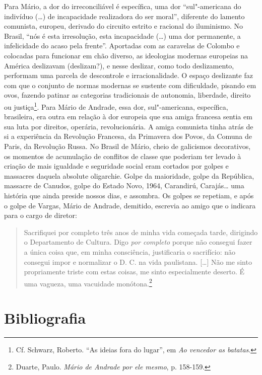 Para Mário, a dor do irreconciliável é específica, uma dor
``sul"-americana do indivíduo (\ldots{}) de incapacidade realizadora do ser
moral'', diferente do lamento comunista, europeu, derivado do circuito
estrito e racional do iluminismo. No Brasil, ``nós é esta irresolução,
esta incapacidade (\ldots{}) uma dor permanente, a infelicidade do acaso pela
frente''. Aportadas com as caravelas de Colombo e colocadas para
funcionar em chão diverso, as ideologias modernas europeias na América
deslizavam (deslizam?), e nesse deslizar, como todo deslizamento,
performam uma parcela de descontrole e irracionalidade. O espaço
deslizante faz com que o conjunto de normas modernas se sustente com
dificuldade, pisando em ovos, fazendo patinar as categorias tradicionais
de autonomia, liberdade, direito ou justiça\footnote{Cf. Schwarz,
  Roberto. ``As ideias fora do lugar'', em \emph{Ao vencedor as
  batatas}.}. Para Mário de Andrade, essa dor, sul"-americana,
específica, brasileira, era outra em relação à dor europeia que sua
amiga francesa sentia em sua luta por direitos, operária,
revolucionária. A amiga comunista tinha atrás de si a experiência da
Revolução Francesa, da Primavera dos Povos, da Comuna de Paris, da
Revolução Russa. No Brasil de Mário, cheio de galicismos decorativos, os
momentos de acumulação de conflitos de classe que poderiam ter levado à
criação de mais igualdade e seguridade social eram cortados por golpes e
massacres daquela absolute oligarchie. Golpe da maioridade, golpe da
República, massacre de Canudos, golpe do Estado Novo, 1964, Carandirú,
Carajás\ldots{} uma história que ainda preside nossos dias, e assombra.
Os golpes se repetiam, e após o golpe de Vargas, Mário de Andrade,
demitido, escrevia ao amigo que o indicara para o cargo de diretor:

\begin{quote}
Sacrifiquei por completo três anos de minha vida começada tarde,
dirigindo o Departamento de Cultura. Digo \emph{por completo} porque não
consegui fazer a única coisa que, em minha consciência, justificaria o
sacrifício: não consegui impor e normalizar o D. C. na vida paulistana.
{[}\ldots{}{]} Não me sinto propriamente triste com estas coisas, me sinto
especialmente deserto. É uma vagueza, uma vacuidade monótona.\footnote{Duarte,
  Paulo. \emph{Mário de Andrade} \emph{por ele mesmo}, p. 158-159.}
\end{quote}

\pagebreak

\section{Bibliografia}

